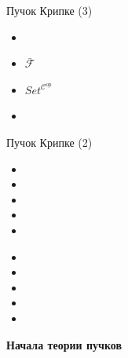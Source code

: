 \documentclass{beamer}
\begin{document}
\begin{frame}{Пучок Крипке (3)}
\begin{itemize}
	\item 
	\item $\mathcal{\bar{F}}$
	\item $Set^{\mathcal{C}^{op}}$
	\item
\end{itemize}
\end{frame}

\begin{frame}{Пучок Крипке (2)}
\begin{itemize}
	\item
	\item
	\item
	\item
	\item
\end{itemize}
\end{frame}


\begin{frame}{}
\begin{itemize}
	\item
	\item
	\item
	\item
	\item
\end{itemize}
\end{frame}



\begin{frame}{}
\begin{center}
	\textbf{Начала теории пучков}
\end{center}
\end{frame}
\end{document}
